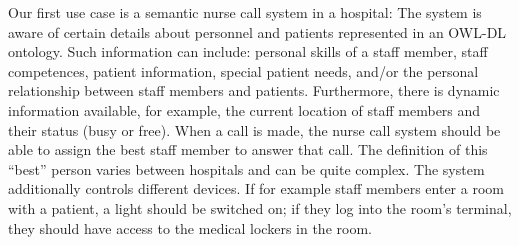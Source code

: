 Our first use case is a semantic nurse call system in a hospital:
The system is aware of certain details about personnel and patients represented in an OWL-DL ontology.
Such information can include: personal skills of a staff member, staff competences, patient information, special patient needs, and/or the 
personal relationship between staff members and patients. 
Furthermore, there is dynamic information available, for example, the current location of staff members and their status (busy or free). 
When a call is made, the nurse
call system should be able to assign the best staff member to answer that call. The definition of this ``best'' person
varies between hospitals and can be quite complex. 
The system additionally controls different devices. If for example staff members enter a room with a patient, 
a light should be switched on; if they log into the room's terminal, they should have access to the medical lockers in the room. 

